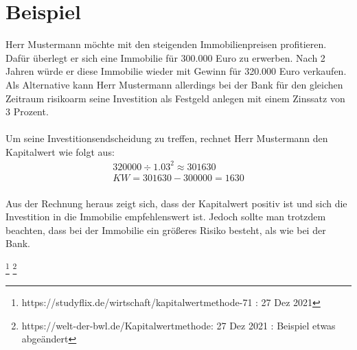 \section{Beispiel}
Herr Mustermann möchte mit den steigenden Immobilienpreisen profitieren. Dafür überlegt er sich eine Immobilie für 300.000 Euro zu erwerben. Nach 2 Jahren würde er diese Immobilie wieder mit Gewinn für 320.000 Euro verkaufen. Als Alternative kann Herr Mustermann allerdings bei der Bank für den gleichen Zeitraum risikoarm seine Investition als Festgeld anlegen mit einem Zinssatz von 3 Prozent.\\ \\
Um seine Investitionsendscheidung zu treffen, rechnet Herr Mustermann den Kapitalwert wie folgt aus:\\

\begin{align*}
    320000 \div 1.03^2 \approx 301630 \\
    KW = 301630 - 300000 = 1630
\end{align*}
\\
Aus der Rechnung heraus zeigt sich, dass der Kapitalwert positiv ist und sich die Investition in die Immobilie empfehlenswert ist. Jedoch sollte man trotzdem beachten, dass bei der Immobilie ein größeres Risiko besteht, als wie bei der Bank.

\footnote{https://studyflix.de/wirtschaft/kapitalwertmethode-71 : 27 Dez 2021}
\footnote{https://welt-der-bwl.de/Kapitalwertmethode: 27 Dez 2021 : Beispiel etwas abgeändert}
